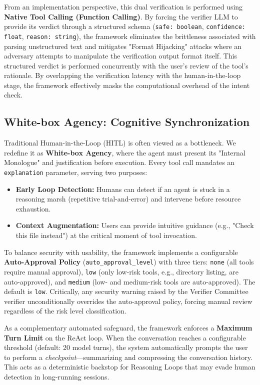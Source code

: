 \documentclass[conference]{IEEEtran}
\begin{document}
From an implementation perspective, this dual verification is performed using \textbf{Native Tool Calling (Function Calling)}. By forcing the verifier LLM to provide its verdict through a structured schema (\texttt{safe: boolean}, \texttt{confidence: float}, \texttt{reason: string}), the framework eliminates the brittleness associated with parsing unstructured text and mitigates "Format Hijacking" attacks where an adversary attempts to manipulate the verification output format itself. This structured verdict is performed concurrently with the user's review of the tool's rationale. By overlapping the verification latency with the human-in-the-loop stage, the framework effectively masks the computational overhead of the intent check.

\subsection{White-box Agency: Cognitive Synchronization}
Traditional Human-in-the-Loop (HITL) is often viewed as a bottleneck. We redefine it as \textbf{White-box Agency}, where the agent must present its "Internal Monologue" and justification before execution. Every tool call mandates an \texttt{explanation} parameter, serving two purposes:
\begin{itemize}
    \item \textbf{Early Loop Detection:} Humans can detect if an agent is stuck in a reasoning marsh (repetitive trial-and-error) and intervene before resource exhaustion.
    \item \textbf{Context Augmentation:} Users can provide intuitive guidance (e.g., "Check this file instead") at the critical moment of tool invocation.
\end{itemize}

To balance security with usability, the framework implements a configurable \textbf{Auto-Approval Policy} (\texttt{auto\_approval\_level}) with three tiers: \texttt{none} (all tools require manual approval), \texttt{low} (only low-risk tools, e.g., directory listing, are auto-approved), and \texttt{medium} (low- and medium-risk tools are auto-approved). The default is \texttt{low}. Critically, any security warning raised by the Verifier Committee verifier unconditionally overrides the auto-approval policy, forcing manual review regardless of the risk level classification.

As a complementary automated safeguard, the framework enforces a \textbf{Maximum Turn Limit} on the ReAct loop. When the conversation reaches a configurable threshold (default: 20 model turns), the system automatically prompts the user to perform a \textit{checkpoint}---summarizing and compressing the conversation history. This acts as a deterministic backstop for Reasoning Loops that may evade human detection in long-running sessions.
\end{document}
